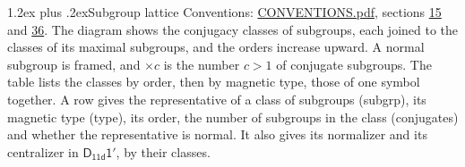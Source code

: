 \documentclass[10pt,a4paper]{article}
\makeatletter
\renewcommand\section{\@startsection{section}{1}{\z@}{-3ex plus -1ex minus -.2ex}%
  {1.2ex plus .2ex}{\normalfont\large\sffamily\bfseries\color{parttitle}}}
\numberwithin{equation}{section}
\newcommand{\grp}[1]{\mathsf{#1}}
\makeatother
\begin{document}
\section{Subgroup lattice}\label{s:subgroups}
Conventions: \href{../../CONVENTIONS.pdf}{CONVENTIONS.pdf}, sections \href{../../../rotation/CONVENTIONS.pdf\#conv.15}{15} and \href{../../CONVENTIONS.pdf\#conv.36}{36}.
The diagram shows the conjugacy classes of subgroups, each joined to the classes of its maximal subgroups, and the orders increase upward. \label{n:index.conjugates.c}\label{n:mark.conjugates}A normal subgroup is framed, and ${\times}c$ is the number $c > 1$ of conjugate subgroups. The table lists the classes by order, then by magnetic type, those of one symbol together. \label{n:head.subgroup}\label{n:head.magnetic.type}\label{n:head.order}\label{n:head.conjugates}\label{n:head.normal}A row gives the representative of a class of subgroups (subgrp), its magnetic type (type), its order, the number of subgroups in the class (conjugates) and whether the representative is normal. \label{n:head.normalizer}\label{n:head.centralizer}It also gives its normalizer and its centralizer in $\grp{D_{11d}1'}$, by their classes. 
\end{document}
